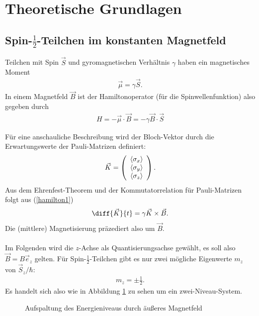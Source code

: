 \section{Theoretische Grundlagen}

\subsection{Spin-$\frac{1}{2}$-Teilchen im konstanten Magnetfeld}
Teilchen mit Spin $\vec{S}$ und gyromagnetischen Verhältnis $\gamma$ haben ein magnetisches Moment
\begin{align*}
  \vec{\mu}=\gamma\vec{S}.
\end{align*}
In einem Magnetfeld $\vec{B}$ ist der Hamiltonoperator (für die Spinwellenfunktion) also gegeben durch
\begin{align}
  H=-\vec{\mu} \cdot \vec{B}=-\gamma \vec{B} \cdot \vec{S} \label{hamilton1}
\end{align}

Für eine anschauliche Beschreibung wird der Bloch-Vektor durch die Erwartungswerte der Pauli-Matrizen definiert:
\begin{align*}
  \vec{K}= \left( \begin{array}{c}
                    \braket{\sigma_x} \\
                    \braket{\sigma_y}\\
                    \braket{\sigma_z}
                  \end{array} \right).
\end{align*}
Aus dem Ehrenfest-Theorem und der Kommutatorrelation für Pauli-Matrizen folgt aus (\ref{hamilton1})
\begin{align}
  \diff{\vec{K}}{t}=\gamma \vec{K} \times \vec{B}.
\end{align}
Die (mittlere) Magnetisierung präzediert also um $\vec{B}.$ \\ \\

Im Folgenden wird die $z$-Achse als Quantisierungsachse gewählt, es soll also $\vec{B}=B\vec{e}_z$ gelten. Für Spin-$\frac{1}{2}$-Teilchen gibt es nur zwei mögliche Eigenwerte $m_z$ von $\vec{S}_z/\hbar$:
\begin{align*}
  m_z=\pm \frac{1}{2}.
\end{align*}
Es handelt sich also wie in Abbildung \ref{aufspaltung} zu sehen um ein zwei-Niveau-System.

\begin{figure}[h]
  \centering
  \caption{Aufspaltung des Energieniveaus durch äußeres Magnetfeld}
  \label{aufspaltung}
\end{figure}

